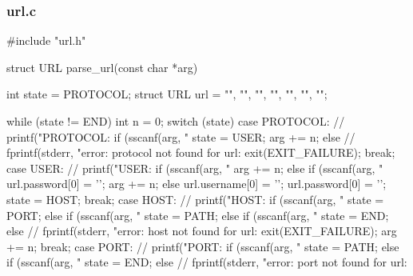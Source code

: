 \documentclass[11pt,a4paper]{article}
\begin{document}
\subsubsection{url.c}
\begin{c-darktheme}
    #include "url.h"

struct URL parse_url(const char *arg)
{
    int state = PROTOCOL;
    struct URL url = {"", "", "", "", "", "", ""};

    while (state != END)
    {
        int n = 0;
        switch (state)
        {
        case PROTOCOL:
            // printf("PROTOCOL: %
            if (sscanf(arg, "%
            {
                state = USER;
                arg += n;
            }
            else
            {
                // fprintf(stderr, "error: protocol not found for url: %
                exit(EXIT_FAILURE);
            }
            break;
        case USER:
            // printf("USER: %
            if (sscanf(arg, "%
            {
                arg += n;
            }
            else if (sscanf(arg, "%
            {
                url.password[0] = '\0';
                arg += n;
            }
            else
            {
                url.username[0] = '\0';
                url.password[0] = '\0';
            }
            state = HOST;
            break;
        case HOST:
            // printf("HOST: %
            if (sscanf(arg, "%
            {
                state = PORT;
            }
            else if (sscanf(arg, "%
            {
                state = PATH;
            }
            else if (sscanf(arg, "%
            {
                state = END;
            }
            else
            {
                // fprintf(stderr, "error: host not found for url: %
                exit(EXIT_FAILURE);
            }
            arg += n;
            break;
        case PORT:
            // printf("PORT: %
            if (sscanf(arg, "%
            {
                state = PATH;
            }
            else if (sscanf(arg, "%
            {
                state = END;
            }
            else
            {
                // fprintf(stderr, "error: port not found for url: %
}}}}
\end{c-darktheme}
\end{document}
